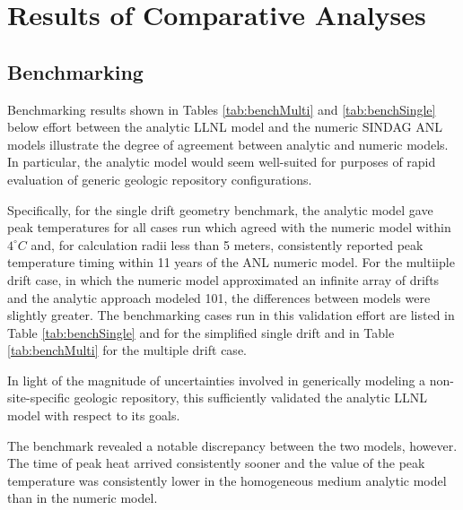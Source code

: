 \documentclass{anstrans}
\begin{document}
\section{Results of Comparative Analyses}

\subsection{Benchmarking}

Benchmarking results shown in Tables \ref{tab:benchMulti} and 
\ref{tab:benchSingle} below  effort between the analytic \gls{LLNL}
model and the numeric \gls{SINDAG} \gls{ANL} models illustrate the degree of agreement 
between analytic and numeric models. In particular, the analytic model would seem 
well-suited for purposes of rapid evaluation of generic geologic repository configurations. 

Specifically, for the single drift geometry benchmark, the 
analytic model gave peak temperatures for all cases run which agreed with the 
numeric model within $4^{\circ}C$ and, for calculation radii less than 5 meters, 
consistently reported peak temperature timing within 11 years of the \gls{ANL} 
numeric model. For the multiiple drift case, in which the numeric model 
approximated an infinite array of drifts and the analytic approach modeled 101, 
the differences between models were slightly greater. The benchmarking cases run 
in this validation effort are listed in Table \ref{tab:benchSingle} and for the 
simplified single drift and in Table \ref{tab:benchMulti} for the multiple drift 
case.

In light of the magnitude of uncertainties involved in generically 
modeling a non-site-specific geologic repository, this sufficiently validated 
the analytic \gls{LLNL} model with respect to its goals.

The benchmark revealed a notable discrepancy between the two models, 
however. The time of peak heat arrived consistently sooner and the value of the 
peak temperature was consistently lower in the homogeneous medium analytic
model than in the numeric model. 
\end{document}

